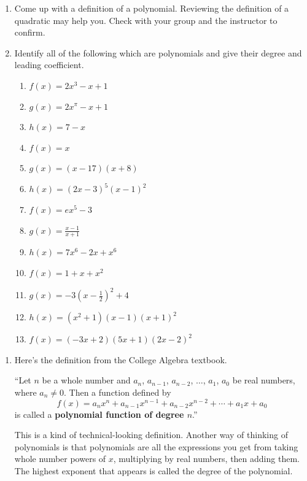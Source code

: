 \documentclass[noauthor]{ximera}
\begin{document}
\begin{problem}
\begin{enumerate}
    \item Come up with a definition of a polynomial. Reviewing the
    definition of a quadratic may help you. Check with your group
    and the instructor to confirm.
    \item Identify all of the following which are polynomials 
    and give their degree and leading coefficient.
    \begin{enumerate}
        \item \(f\left(x\right)=2x^3-x+1\)
	    \item \(g\left(x\right)=2x^\pi-x+1\)
	    \item \(h\left(x\right)=7-x\)
	    \item \(f\left(x\right)=x\)
	    \item \(g\left(x\right)=\left(x-17\right)\left(x+8\right)\)
	    \item \(h\left(x\right)=\left(2x-3\right)^5\left(x-1\right)^2\)
	    \item \(f\left(x\right)= e x^5-3\)
	    \item \(g\left(x\right)=\frac{x-1}{x+1}\)
	    \item \(h\left(x\right)=7x^6-2x+x^6\)
	    \item \(f\left(x\right)=1+x+x^2\)
	    \item \(g\left(x\right)=-3\left(x-\frac{1}{2}\right)^2+4\)
	    \item \(h\left(x\right)=\left(x^2+1\right)\left(x-1\right)\left(x+1\right)^2\)
	    \item \(f\left(x\right)=\left(-3x+2\right)\left(5x+1\right)\left(2x-2\right)^2\) 
    \end{enumerate}
\end{enumerate}

\begin{explanation}
\begin{enumerate}
    \item Here's the definition from the College Algebra textbook.
    
    ``Let \(n\) be a whole number and \(a_n\), \(a_{n - 1}\), \(a_{n - 2}\), \(\ldots\), \(a_1\), \(a_0\) be real numbers,
    where \(a_n \ne 0\). Then a function defined by 
    $$
    f(x) = a_nx^n + a_{n - 1}x^{n - 1} + a_{n - 2}x^{n-2} + \cdots + a_1 x + a_0
    $$
    is called a \textbf{polynomial function of degree \(n\)}.''

    This is a kind of technical-looking definition. Another way of thinking of polynomials is that polynomials are all the expressions you get from
    taking whole number powers of \(x\), multiplying by real numbers, then adding them. The highest exponent that appears is called the degree of the polynomial. 


\end{enumerate}
\end{explanation}
\end{problem}
\end{document}
